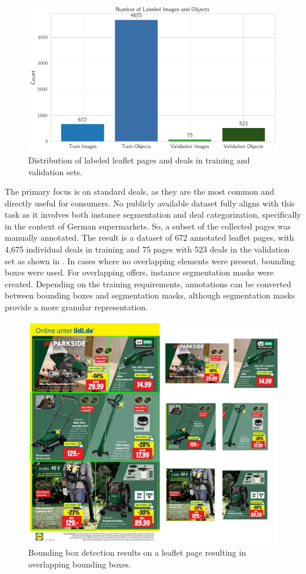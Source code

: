 \documentclass[11pt]{article}
\begin{document}
\begin{figure}[h!]
    \centering
    \includegraphics[width=0.7\linewidth]{figures/deal_detection/dataset_count.png}
    \caption{Distribution of labeled leaflet pages and deals in training and validation sets.}
    \label{fig:ddetect_dataset_count}
\end{figure}

The primary focus is on standard deals, as they are the most common and directly useful for consumers. No publicly available dataset fully aligns with this task as it involves both instance segmentation and deal categorization, specifically in the context of German supermarkets. So, a subset of the collected pages was manually annotated. The result is a dataset of 672 annotated leaflet pages, with 4,675 individual deals in training and 75 pages with 523 deals in the validation set as shown in . In cases where no overlapping elements were present, bounding boxes were used. For overlapping offers, instance segmentation masks were created. Depending on the training requirements, annotations can be converted between bounding boxes and segmentation masks, although segmentation masks provide a more granular representation.

\begin{figure}[h!]
    \centering
    \includegraphics[width=0.6\linewidth]{figures/deal_detection/bbox_page.png}
    \caption{Bounding box detection results on a leaflet page resulting in overlapping bounding boxes.}
    \label{fig:ddetect_bbox_page}
\end{figure}
\end{document}
